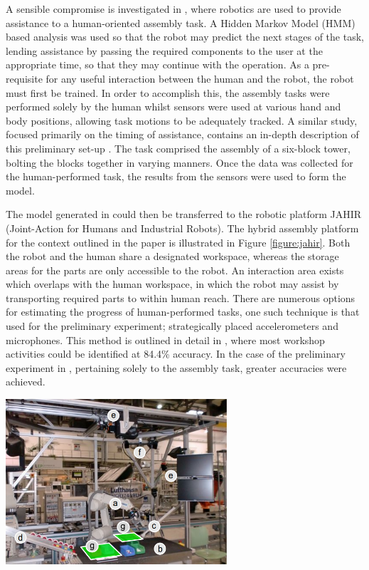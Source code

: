 \documentclass[11pt]{article}
\begin{document}
A sensible compromise is investigated in \cite{lenz2011}, where robotics are used to provide assistance to a human-oriented assembly task. A Hidden Markov Model (HMM) based analysis was used so that the robot may predict the next stages of the task, lending assistance by passing the required components to the user at the appropriate time, so that they may continue with the operation. As a pre-requisite for any useful interaction between the human and the robot, the robot must first be trained. In order to accomplish this, the assembly tasks were performed solely by the human whilst sensors were used at various hand and body positions, allowing task motions to be adequately tracked. A similar study, focused primarily on the timing of assistance, contains an in-depth description of this preliminary set-up \cite{huber2010}. The task comprised the assembly of a six-block tower, bolting the blocks together in varying manners. Once the data was collected for the human-performed task, the results from the sensors were used to form the model.

The model generated in \cite{lenz2011} could then be transferred to the robotic platform JAHIR (Joint-Action for Humans and Industrial Robots). The hybrid assembly platform for the context outlined in the paper is illustrated in Figure \ref{figure:jahir}. Both the robot and the human share a designated workspace, whereas the storage areas for the parts are only accessible to the robot. An interaction area exists which overlaps with the human workspace, in which the robot may assist by transporting required parts to within human reach. There are numerous options for estimating the progress of human-performed tasks, one such technique is that used for the preliminary experiment; strategically placed accelerometers and microphones. This method is outlined in detail in \cite{lukowicz2004}, where most workshop activities could be identified at 84.4\% accuracy. In the case of the preliminary experiment in \cite{lenz2011}, pertaining solely to the assembly task, greater accuracies were achieved.

\begin{center}
\includegraphics[width = 0.62\textwidth]{jahir.png}
\label{figure:jahir}
\end{center}
\end{document}
